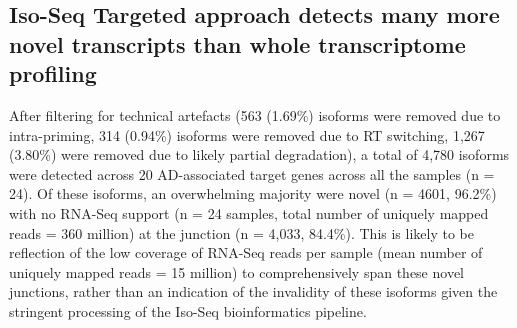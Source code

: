 \clearpage
\subsection{Iso-Seq Targeted approach detects many more novel transcripts than whole transcriptome profiling}
After filtering for technical artefacts (563 (1.69\%) isoforms were removed due to intra-priming, 314 (0.94\%) isoforms were removed due to RT switching, 1,267 (3.80\%) were removed due to likely partial degradation), a total of 4,780 isoforms were detected across 20 AD-associated target genes across all the samples (n = 24). Of these isoforms, an overwhelming majority were novel (n = 4601, 96.2\%) with no RNA-Seq support (n = 24 samples, total number of uniquely mapped reads = 360 million) at the junction (n = 4,033, 84.4\%). This is likely to be reflection of the low coverage of RNA-Seq reads per sample  (mean number of uniquely mapped reads = 15 million) to comprehensively span these novel junctions, rather than an indication of the invalidity of these isoforms given the stringent processing of the Iso-Seq bioinformatics pipeline. 



